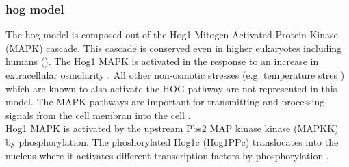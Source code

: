 \subsubsection{hog model}
The hog model is composed out of the Hog1 Mitogen Activated Protein Kinase (MAPK) cascade. This cascade is conserved even in higher eukaryotes including humans (\cite{ASimpleMathematicalModel}). The Hog1 MAPK is activated in the response to an increase in extracellular osmolarity \cite{Saito2012}. All other non-osmotic stresses (e.g. temperature stres \cite{Saito2012}) which are known to also activate the HOG pathway are not represented in this model. The MAPK pathways are important for transmitting and processing signals from the cell membran into the cell \cite{ASimpleMathematicalModel}. \\
Hog1 MAPK is activated by the upstream Pbs2 MAP kinase kinase (MAPKK) by phosphorylation. The phoshorylated Hog1c (Hog1PPc) translocates into the nucleus where it activates different transcription factors by phosphorylation \cite{JannisUhlendorf}.


\newpage